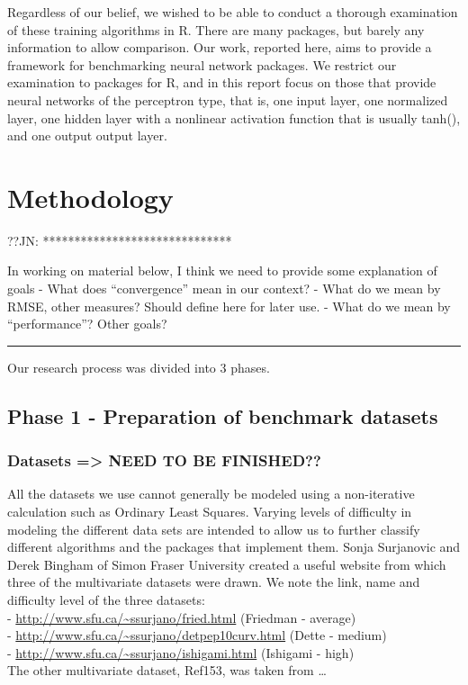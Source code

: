 Regardless of our belief, we wished to be able to conduct a thorough
examination of these training algorithms in R. There are many packages,
but barely any information to allow comparison. Our work, reported here,
aims to provide a framework for benchmarking neural network packages. We
restrict our examination to packages for R, and in this report focus on
those that provide neural networks of the perceptron type, that is, one
input layer, one normalized layer, one hidden layer with a nonlinear
activation function that is usually tanh(), and one output output layer.

\hypertarget{methodology}{%
\section{Methodology}\label{methodology}}

??JN: ******************************

In working on material below, I think we need to provide some
explanation of goals - What does ``convergence'' mean in our context? -
What do we mean by RMSE, other measures? Should define here for later
use. - What do we mean by ``performance''? Other goals?

\begin{center}\rule{0.5\linewidth}{0.5pt}\end{center}

Our research process was divided into 3 phases.

\hypertarget{phase-1---preparation-of-benchmark-datasets}{%
\subsection{Phase 1 - Preparation of benchmark
datasets}\label{phase-1---preparation-of-benchmark-datasets}}

\hypertarget{datasets-need-to-be-finished}{%
\subsubsection{Datasets =\textgreater{} NEED TO BE
FINISHED??}\label{datasets-need-to-be-finished}}

All the datasets we use cannot generally be modeled using a
non-iterative calculation such as Ordinary Least Squares. Varying levels
of difficulty in modeling the different data sets are intended to allow
us to further classify different algorithms and the packages that
implement them. Sonja Surjanovic and Derek Bingham of Simon Fraser
University created a useful website from which three of the multivariate
datasets were drawn. We note the link, name and difficulty level of the
three datasets:\\
- \url{http://www.sfu.ca/~ssurjano/fried.html} (Friedman - average)\\
- \url{http://www.sfu.ca/~ssurjano/detpep10curv.html} (Dette - medium)\\
- \url{http://www.sfu.ca/~ssurjano/ishigami.html} (Ishigami - high)\\
The other multivariate dataset, Ref153, was taken from \ldots{}


